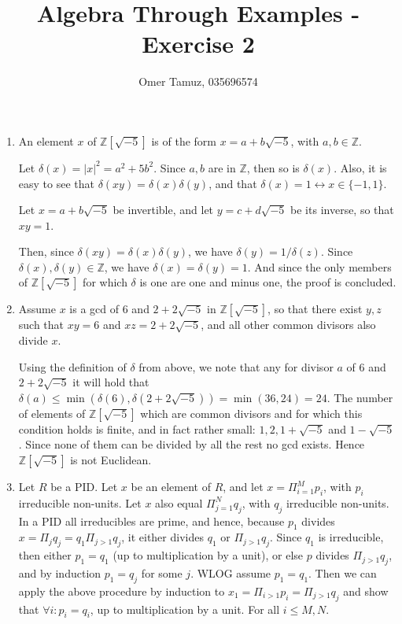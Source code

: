 \documentclass[11pt]{article} \usepackage{amssymb}
\newcommand{\Z}{\mathbb Z} \newcommand{\CalE}{{\mathcal{E}}}
\begin{document}
\title{Algebra Through Examples - Exercise 2}

 \author{Omer Tamuz, 035696574}
\maketitle


\begin{enumerate}
  \item An element $x$ of $\Z[\sqrt{-5}]$ is of the form $x=a+b\sqrt{-5}$, with $a,b\in\Z$. 

    Let $\delta(x)=|x|^2=a^2+5b^2$. Since $a,b$ are in $\Z$, then so is $\delta(x)$. Also,
    it is easy to see that $\delta(xy)=\delta(x)\delta(y)$, and that 
    $\delta(x)=1\leftrightarrow x\in\{-1,1\}$.

    Let
    $x=a+b\sqrt{-5}$ be invertible, and let $y=c+d\sqrt{-5}$ be its inverse, 
    so that $xy=1$. 
    

    Then, since $\delta(xy)=\delta(x)\delta(y)$,
    we have $\delta(y)=1/\delta(z)$. Since $\delta(x),\delta(y)\in\Z$, we have 
    $\delta(x)=\delta(y)=1$. And since the only members of $\Z[\sqrt{-5}]$
    for which $\delta$ is one are one and minus one, the proof is concluded.
    
  \item Assume $x$ is a gcd of $6$ and $2+2\sqrt{-5}$ in $\Z[\sqrt{-5}]$, so that there exist
    $y,z$ such that $xy=6$
    and $xz=2+2\sqrt{-5}$, and all other common divisors also divide $x$.


    Using the definition of $\delta$ from above, we note that any for divisor $a$
    of $6$ and $2+2\sqrt{-5}$ it will hold that 
    $\delta(a)\leq \min(\delta(6),\delta(2+2\sqrt{-5}))=\min(36,24)=24$. The number of elements of 
    $\Z[\sqrt{-5}]$ which are common divisors and for which this condition holds is 
    finite, and in fact
    rather small: $1,2,1+\sqrt{-5}$ and $1-\sqrt{-5}$. Since none of them can be divided
    by all the rest no gcd exists. Hence $\Z[\sqrt{-5}]$ is not Euclidean.

  \item Let $R$ be a PID.  Let $x$ be an element of $R$, and let
    $x=\Pi_{i=1}^Mp_i$, with $p_i$ irreducible non-units.
    Let $x$ also equal $\Pi_{j=1}^Nq_j$, with $q_j$ irreducible non-units.
    In a PID all irreducibles are
    prime, and hence, because $p_1$ divides $x=\Pi_jq_j=q_1\Pi_{j>1}q_j$,
    it either divides $q_1$ or $\Pi_{j>1}q_j$. 
    Since $q_1$ is irreducible, then either $p_1=q_1$ (up to multiplication by
    a unit), or else $p$ divides
    $\Pi_{j>1}q_j$, and by induction $p_1=q_j$ for some $j$. WLOG assume $p_1=q_1$. Then
    we can apply the above procedure by induction to 
    $x_1=\Pi_{i>1}p_i=\Pi_{j>1}q_j$ and show that
    $\forall i:p_i=q_i$, up to multiplication by a unit. For all $i\leq M,N$.  


\end{enumerate}
\end{document}
